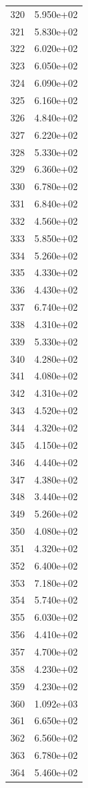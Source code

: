 \documentclass[12pt]{article}
\begin{document}
\begin{longtable}{@{}cc@{}}
320 & 5.950e+02 \\
321 & 5.830e+02 \\
322 & 6.020e+02 \\
323 & 6.050e+02 \\
324 & 6.090e+02 \\
325 & 6.160e+02 \\
326 & 4.840e+02 \\
327 & 6.220e+02 \\
328 & 5.330e+02 \\
329 & 6.360e+02 \\
330 & 6.780e+02 \\
331 & 6.840e+02 \\
332 & 4.560e+02 \\
333 & 5.850e+02 \\
334 & 5.260e+02 \\
335 & 4.330e+02 \\
336 & 4.430e+02 \\
337 & 6.740e+02 \\
338 & 4.310e+02 \\
339 & 5.330e+02 \\
340 & 4.280e+02 \\
341 & 4.080e+02 \\
342 & 4.310e+02 \\
343 & 4.520e+02 \\
344 & 4.320e+02 \\
345 & 4.150e+02 \\
346 & 4.440e+02 \\
347 & 4.380e+02 \\
348 & 3.440e+02 \\
349 & 5.260e+02 \\
350 & 4.080e+02 \\
351 & 4.320e+02 \\
352 & 6.400e+02 \\
353 & 7.180e+02 \\
354 & 5.740e+02 \\
355 & 6.030e+02 \\
356 & 4.410e+02 \\
357 & 4.700e+02 \\
358 & 4.230e+02 \\
359 & 4.230e+02 \\
360 & 1.092e+03 \\
361 & 6.650e+02 \\
362 & 6.560e+02 \\
363 & 6.780e+02 \\
364 & 5.460e+02 \\

\end{longtable}
\end{document}
